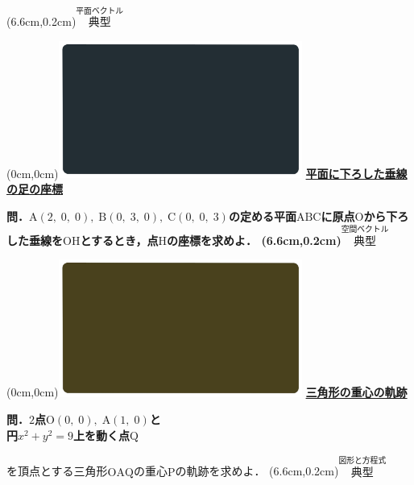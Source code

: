\documentclass[10pt,
fleqn,
dvipdfmx,
uplatex
]{jsarticle}
\begin{document}
\at(6.6cm,0.2cm){\small\color{bradorange}$\overset{\text{平面ベクトル}}{\text{典型}}$}


\newpage



\at(0cm,0cm){\includegraphics[width=8cm,bb=0 0 1920 1080]{./youtube/thumbnails/templates/smart_background/空間ベクトル.jpeg}}
{\color{orange}\bf\boldmath\Large\underline{平面に下ろした垂線の足の座標}}\vspace{0.3zw}

\Large 
\bf\boldmath 問．$\text{A}\left(2,\;0,\;0\right),\;\text{B}\left(0,\;3,\;0\right),\;\text{C}\left(0,\;0,\;3\right)$の定める平面$\text{ABC}$に原点$\text{O}$から下ろした垂線を$\text{OH}$とするとき，点$\text{H}$の座標を求めよ．
\at(6.6cm,0.2cm){\small\color{bradorange}$\overset{\text{空間ベクトル}}{\text{典型}}$}


\newpage

\at(0cm,0cm){\includegraphics[width=8cm,bb=0 0 1920 1080]{./youtube/thumbnails/templates/smart_background/図形と方程式.jpeg}}
{\color{orange}\bf\boldmath\LARGE\underline{三角形の重心の軌跡}}\vspace{0.3zw}

\large 
\bf\boldmath 問．$2$点$\text{O}\left(0,\;0\right),\;\text{A}\left(1,\;0\right)$と\\
\hfill 円$x^2+y^2=9$上を動く点$\text{Q}$

\LARGE
を頂点とする三角形$\text{OAQ}$の重心$\text{P}$の軌跡を求めよ．
\at(6.6cm,0.2cm){\small\color{bradorange}$\overset{\text{図形と方程式}}{\text{典型}}$}

\newpage
\end{document}
